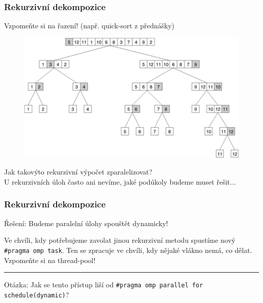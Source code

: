 \documentclass[usenames,dvipsnames,9pt]{beamer}
\begin{document}
\begin{frame}[fragile]
	\frametitle{Rekurzivní dekompozice}


	\hfill Vzpomeňte si na řazení! (např. quick-sort z přednášky)

	\begin{figure}
		\centering\includegraphics[width=0.7\linewidth]{05/figs/quicksort.png}
	\end{figure}

	\pause\vspace{2em}

	\begin{center}
		{\Large Jak takovýto rekurzivní výpočet zparalelizovat?}\\
		U rekurzivních úloh často ani nevíme, jaké podúkoly budeme muset řešit...
	\end{center}
\end{frame}

\begin{frame}
	\frametitle{Rekurzivní dekompozice}

	{\Large Řešení: Budeme paralelní úlohy spouštět dynamicky!}

	\hfill\begin{minipage}{0.8\linewidth}
	  Ve chvíli, kdy potřebujeme zavolat jinou rekurzivní metodu spustíme nový \texttt{\#pragma omp task}.
	  Ten se zpracuje ve chvíli, kdy nějaké vlákno nemá, co dělat.
	  Vzpomeňte si na thread-pool!
  \end{minipage}

  \pause
  \vspace{2em}\hrule\vspace{2em}

  Otázka: Jak se tento přístup liší od \texttt{\#pragma omp parallel for schedule(dynamic)}?
\end{frame}
\end{document}
